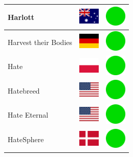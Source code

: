 \documentclass[12pt, a4paper, twoside]{report}
\begin{document}
\begin{center}
\begin{longtable}{|p{5cm}|p{2cm}|p{2cm}|}
Harlott & \includegraphics[width=1cm]{4x3/au} & \includegraphics[width=1cm]{likes/y} \\ \hline
Harvest their Bodies & \includegraphics[width=1cm]{4x3/de} & \includegraphics[width=1cm]{likes/y} \\ \hline
Hate & \includegraphics[width=1cm]{4x3/pl} & \includegraphics[width=1cm]{likes/y} \\ \hline
Hatebreed & \includegraphics[width=1cm]{4x3/us} & \includegraphics[width=1cm]{likes/y} \\ \hline
Hate Eternal & \includegraphics[width=1cm]{4x3/us} & \includegraphics[width=1cm]{likes/y} \\ \hline
HateSphere & \includegraphics[width=1cm]{4x3/dk} & \includegraphics[width=1cm]{likes/y} \\ \hline

\end{longtable}
\end{center}
\end{document}
